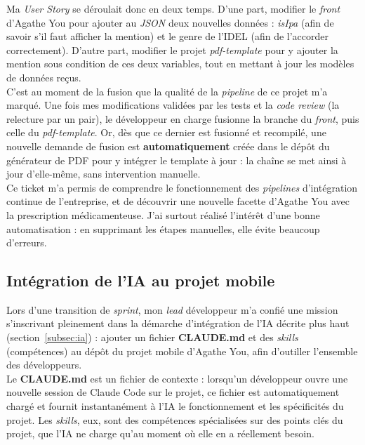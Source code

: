 \documentclass{article}
\begin{document}
Ma \textit{User Story} se déroulait donc en deux temps. D'une part, modifier le \textit{front} d'Agathe You pour ajouter au \textit{JSON} deux nouvelles données : \textit{isIpa} (afin de savoir s'il faut afficher la mention) et le genre de l'IDEL (afin de l'accorder correctement). D'autre part, modifier le projet \textit{pdf-template} pour y ajouter la mention sous condition de ces deux variables, tout en mettant à jour les modèles de données reçus.\\

C'est au moment de la fusion que la qualité de la \textit{pipeline} de ce projet m'a marqué. Une fois mes modifications validées par les tests et la \textit{code review} (la relecture par un pair), le développeur en charge fusionne la branche du \textit{front}, puis celle du \textit{pdf-template}. Or, dès que ce dernier est fusionné et recompilé, une nouvelle demande de fusion est \textbf{automatiquement} créée dans le dépôt du générateur de PDF pour y intégrer le template à jour : la chaîne se met ainsi à jour d'elle-même, sans intervention manuelle.\\

Ce ticket m'a permis de comprendre le fonctionnement des \textit{pipelines} d'intégration continue de l'entreprise, et de découvrir une nouvelle facette d'Agathe You avec la prescription médicamenteuse. J'ai surtout réalisé l'intérêt d'une bonne automatisation : en supprimant les étapes manuelles, elle évite beaucoup d'erreurs.


\subsection{Intégration de l'IA au projet mobile}

Lors d'une transition de \textit{sprint}, mon \textit{lead} développeur m'a confié une mission s'inscrivant pleinement dans la démarche d'intégration de l'IA décrite plus haut (section~\ref{subsec:ia}) : ajouter un fichier \textbf{CLAUDE.md} et des \textit{skills} (compétences) au dépôt du projet mobile d'Agathe You, afin d'outiller l'ensemble des développeurs.\\

Le \textbf{CLAUDE.md} est un fichier de contexte : lorsqu'un développeur ouvre une nouvelle session de Claude Code sur le projet, ce fichier est automatiquement chargé et fournit instantanément à l'IA le fonctionnement et les spécificités du projet. Les \textit{skills}, eux, sont des compétences spécialisées sur des points clés du projet, que l'IA ne charge qu'au moment où elle en a réellement besoin.\\
\end{document}
